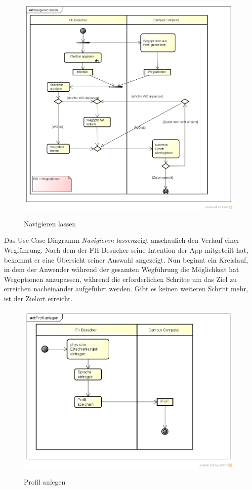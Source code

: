 \begin{figure}[hbt]
  \centering
  \includegraphics[width=\linewidth]{img/akt_navigieren_lassen.png}
  \label{img:akt_navigieren_lassen}
  \caption{Navigieren lassen}
\end{figure}

\noindent Das Use Case Diagramm \emph{Navigieren lassen}zeigt anschaulich den Verlauf einer Wegführung. Nach dem der FH Besucher seine Intention der App mitgeteilt hat, bekommt er eine Übersicht seiner Auswahl angezeigt. Nun beginnt ein Kreislauf, in dem der Anwender während der gesamten Wegführung die Möglichkeit hat Wegoptionen anzupassen, während die erforderlichen Schritte um das Ziel zu erreichen nacheinander aufgeführt werden. Gibt es keinen weiteren Schritt mehr, ist der Zielort erreicht.

\begin{figure}[hbt]
  \centering
  \includegraphics[width=\linewidth]{img/akt_profil_anlegen.png}
  \label{img:akt_profil_anlegen}
  \caption{Profil anlegen}
\end{figure}

